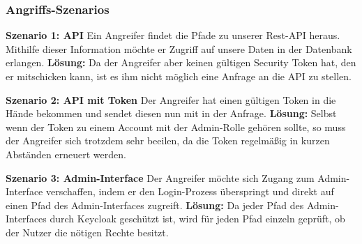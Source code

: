 \newpage
\subsubsection{Angriffs-Szenarios}
\noindent \textbf{Szenario 1: API}
\newline
Ein Angreifer findet die Pfade zu unserer Rest-API heraus. 
Mithilfe dieser Information möchte er Zugriff auf unsere Daten in der Datenbank erlangen.
\newline \newline
\noindent \textbf{Lösung: } \newline
Da der Angreifer aber keinen gültigen Security Token hat, den er mitschicken kann, ist es ihm 
nicht möglich eine Anfrage an die API zu stellen.
\newline \newline

\noindent \textbf{Szenario 2: API mit Token}
\newline
Der Angreifer hat einen gültigen Token in die Hände bekommen und sendet diesen nun mit in der Anfrage.
\newline \newline
\noindent \textbf{Lösung: } \newline
Selbst wenn der Token zu einem Account mit der Admin-Rolle gehören sollte, so muss der Angreifer 
sich trotzdem sehr beeilen, da die Token regelmäßig in kurzen Abständen erneuert werden.
\newline \newline

\noindent \textbf{Szenario 3: Admin-Interface}
\newline
Der Angreifer möchte sich Zugang zum Admin-Interface verschaffen, indem er den Login-Prozess 
überspringt und direkt auf einen Pfad des Admin-Interfaces zugreift. 
\newline \newline
\noindent \textbf{Lösung: } \newline
Da jeder Pfad des Admin-Interfaces durch Keycloak geschützt ist, wird für jeden Pfad 
einzeln geprüft, ob der Nutzer die nötigen Rechte besitzt.